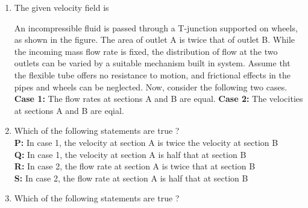 \documentclass[journal,12pt,onecolumn]{IEEEtran}
\theoremstyle{remark}
\begin{document}
\begin{enumerate}
	\item The given velocity field is
		\begin{enumerate}
		\end{enumerate}
		An incompressible fluid is passed through a T-junction supported on wheels, as shown in the figure. The area of outlet A is twice that of outlet B. While the incoming mass flow rate is fixed, the distribution of flow at the two outlets can be varied by a suitable mechanism built in system. Assume tht the flexible tube offers no resistance to motion, and frictional effects in the pipes and wheels can be neglected. Now, consider the following two cases. \\
		\textbf{Case 1:} The flow rates at sections A and B are equal.
		\textbf{Case 2:} The velocities at sections A and B are eqial.
		\begin{figure}[H]
			\centering
			
			\caption{}
			\label{25}
		\end{figure}
	\item Which of the following statements are true ?\\
		\textbf{P:} In case 1, the velocity at section A is twice the velocity at section B \\
		\textbf{Q:} In case 1, the velocity at section A is half that at section B\\
		\textbf{R:} In case 2, the flow rate at section A is twice that at section B \\
		\textbf{S:} In case 2, the flow rate at section A is half that at section B \\
		\begin{enumerate}
				\begin{multicols}{4}
				\item P,R
				\item P,S
				\item Q,R
				\item Q,S
				\end{multicols}
		\end{enumerate}
	\item Which of the following statements are true ? \\

\end{enumerate}
\end{document}
